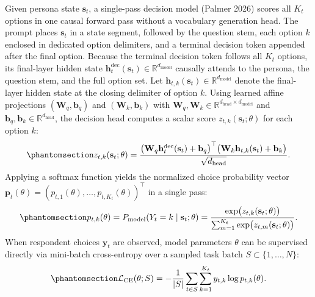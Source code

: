 \documentclass[
  11pt,
  letterpaper,
]{article}
\begin{document}
Given persona state \(\mathbf{s}_t\), a single-pass decision model
(Palmer 2026) scores all \(K_t\) options in one causal forward pass
without a vocabulary generation head. The prompt places \(\mathbf{s}_t\)
in a state segment, followed by the question stem, each option \(k\)
enclosed in dedicated option delimiters, and a terminal decision token
appended after the final option. Because the terminal decision token
follows all \(K_t\) options, its final-layer hidden state
\(\mathbf{h}^{\mathrm{dec}}_t(\mathbf{s}_t) \in \mathbb{R}^{d_{\mathrm{model}}}\)
causally attends to the persona, the question stem, and the full option
set. Let
\(\mathbf{h}_{t,k}(\mathbf{s}_t) \in \mathbb{R}^{d_{\mathrm{model}}}\)
denote the final-layer hidden state at the closing delimiter of option
\(k\). Using learned affine projections \((\mathbf{W}_q, \mathbf{b}_q)\)
and \((\mathbf{W}_k, \mathbf{b}_k)\) with
\(\mathbf{W}_q, \mathbf{W}_k \in \mathbb{R}^{d_{\mathrm{head}} \times d_{\mathrm{model}}}\)
and \(\mathbf{b}_q, \mathbf{b}_k \in \mathbb{R}^{d_{\mathrm{head}}}\),
the decision head computes a scalar score
\(z_{t,k}(\mathbf{s}_t; \theta)\) for each option \(k\):
\begin{equation}\protect\phantomsection\label{eq-pointer-head}{
z_{t,k}(\mathbf{s}_t; \theta) = \frac{\big(\mathbf{W}_q \mathbf{h}^{\mathrm{dec}}_t(\mathbf{s}_t) + \mathbf{b}_q\big)^\top \big(\mathbf{W}_k \mathbf{h}_{t,k}(\mathbf{s}_t) + \mathbf{b}_k\big)}{\sqrt{d_{\mathrm{head}}}}.
}\end{equation} Applying a softmax function yields the normalized choice
probability vector
\(\mathbf{p}_t(\theta) = (p_{t,1}(\theta), \dots, p_{t,K_t}(\theta))^\top\)
in a single pass:
\begin{equation}\protect\phantomsection\label{eq-model-pmf}{
p_{t,k}(\theta) = P_{\mathrm{model}}(Y_t = k \mid \mathbf{s}_t; \theta) = \frac{\exp\!\big(z_{t,k}(\mathbf{s}_t; \theta)\big)}{\sum_{m=1}^{K_t} \exp\!\big(z_{t,m}(\mathbf{s}_t; \theta)\big)}.
}\end{equation} When respondent choices \(\mathbf{y}_t\) are observed,
model parameters \(\theta\) can be supervised directly via mini-batch
cross-entropy over a sampled task batch \(S \subset \{1, \dots, N\}\):
\begin{equation}\protect\phantomsection\label{eq-resp-ce}{
\mathcal{L}_{\mathrm{CE}}(\theta; S) = -\frac{1}{|S|} \sum_{t \in S} \sum_{k=1}^{K_t} y_{t,k} \log p_{t,k}(\theta).
}\end{equation}
\end{document}
